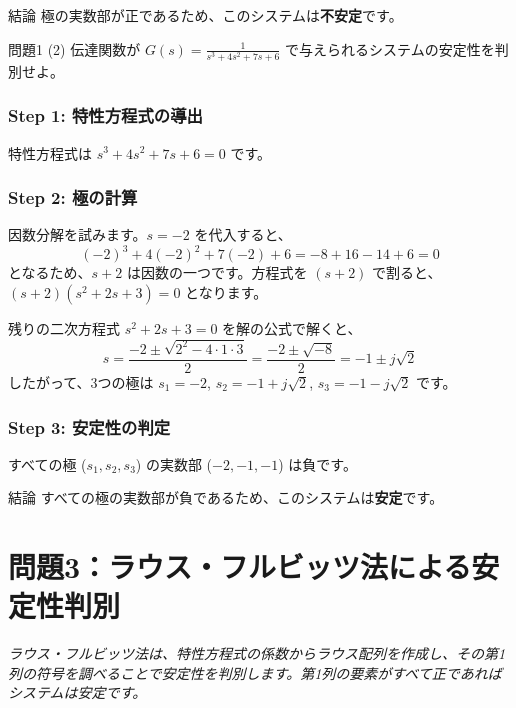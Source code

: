 \documentclass[11pt,a4paper]{ltjsarticle}
\begin{document}
\begin{conclusion}{結論}
    極の実数部が正であるため、このシステムは\textbf{不安定}です。
\end{conclusion}

\hrulefill
\vspace{1cm}

\begin{problem}{問題1 (2)}
    伝達関数が $G(s) = \frac{1}{s^3+4s^2+7s+6}$ で与えられるシステムの安定性を判別せよ。
\end{problem}

\begin{solution}
    \subsubsection*{Step 1: 特性方程式の導出}
    特性方程式は $s^3+4s^2+7s+6=0$ です。

    \subsubsection*{Step 2: 極の計算}
    因数分解を試みます。$s=-2$ を代入すると、
    $$ (-2)^3 + 4(-2)^2 + 7(-2) + 6 = -8 + 16 - 14 + 6 = 0 $$
    となるため、$s+2$ は因数の一つです。方程式を $(s+2)$ で割ると、$(s+2)(s^2+2s+3)=0$ となります。
    
    残りの二次方程式 $s^2+2s+3=0$ を解の公式で解くと、
    $$ s = \frac{-2 \pm \sqrt{2^2 - 4 \cdot 1 \cdot 3}}{2} = \frac{-2 \pm \sqrt{-8}}{2} = -1 \pm j\sqrt{2} $$
    したがって、3つの極は $s_1 = -2$, $s_2 = -1+j\sqrt{2}$, $s_3 = -1-j\sqrt{2}$ です。

    \subsubsection*{Step 3: 安定性の判定}
    すべての極 ($s_1, s_2, s_3$) の実数部 ($-2, -1, -1$) は負です。
\end{solution}

\begin{conclusion}{結論}
    すべての極の実数部が負であるため、このシステムは\textbf{安定}です。
\end{conclusion}

\clearpage

\section{問題3：ラウス・フルビッツ法による安定性判別}
\textit{ラウス・フルビッツ法は、特性方程式の係数からラウス配列を作成し、その第1列の符号を調べることで安定性を判別します。第1列の要素がすべて正であればシステムは安定です。}
\end{document}
